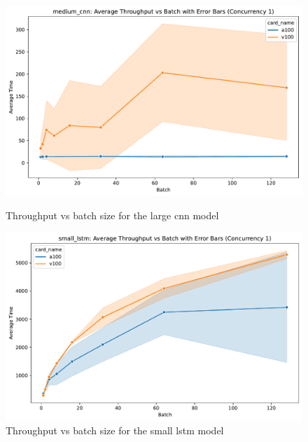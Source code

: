 \documentclass[sigplan,screen,noacm]{acmart}
\begin{document}
\begin{figure}[h]
\begin{minipage}[t]{0.4\textwidth}
  \centering
  \includegraphics[width=1.0\linewidth]{images/throughput_vs_batch_medium_cnn_1.pdf}
  \caption{Throughput vs batch size for the large cnn model}
    \label{fig:result-6}

  \centering
  \includegraphics[width=1.0\linewidth]{images/throughput_vs_batch_small_lstm_1.pdf}
  \caption{Throughput vs batch size for the small lstm model}
    \label{fig:result-3}

\end{minipage}
\end{figure}
\end{document}
